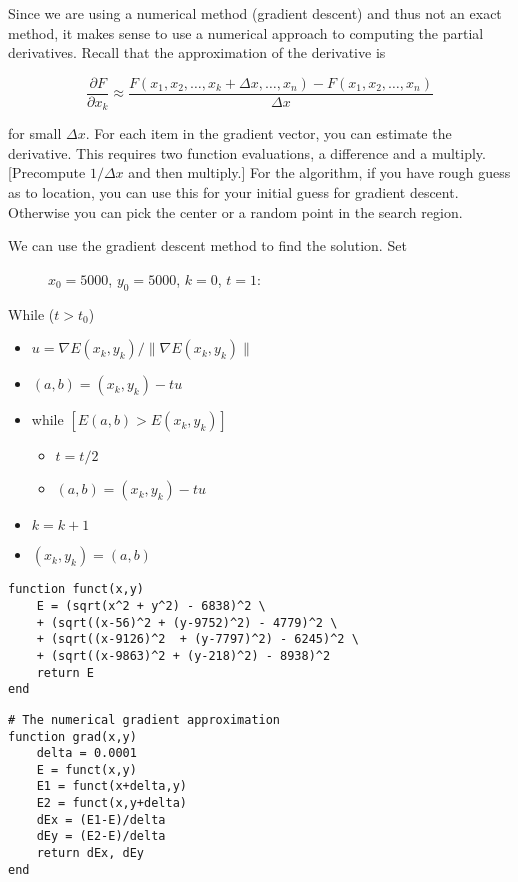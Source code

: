 Since we are using a numerical method (gradient descent) and thus not an
exact method, it makes sense to use a numerical approach to computing
the partial derivatives. Recall that the approximation of the derivative
is

\[\displaystyle \frac{\partial F}{\partial x_k} \approx \frac{F(x_1, x_2, \dots , x_k + \Delta x, \dots , x_n) - F(x_1, x_2, \dots  , x_n)}{\Delta x}\]

for small \(\Delta x\). For each item in the gradient vector, you can
estimate the derivative. This requires two function evaluations, a
difference and a multiply. {[}Precompute \(1/\Delta x\) and then
multiply.{]} For the algorithm, if you have rough guess as to location,
you can use this for your initial guess for gradient descent. Otherwise
you can pick the center or a random point in the search region.

\begin{description}
\item[We can use the gradient descent method to find the solution. Set]
\(x_0 = 5000\), \(y_0=5000\), \(k=0\), \(t=1\):
\end{description}

While (\(t > t_0\))

\begin{itemize}
\tightlist
\item
  \(u = \nabla E (x_k, y_k) /  \| \nabla E (x_k, y_k) \|\)
\item
  \((a,b) = (x_k,y_k) - t u\)
\item
  while \(\left[ E(a,b) > E(x_k,y_k)\right]\)

  \begin{itemize}
  \tightlist
  \item
    \(t = t/2\)
  \item
    \((a,b) = (x_k,y_k) - t u\)
  \end{itemize}
\item
  \(k=k+1\)
\item
  \((x_k,y_k) = (a,b)\)
\end{itemize}

\begin{verbatim}
function funct(x,y)
    E = (sqrt(x^2 + y^2) - 6838)^2 \
    + (sqrt((x-56)^2 + (y-9752)^2) - 4779)^2 \
    + (sqrt((x-9126)^2  + (y-7797)^2) - 6245)^2 \
    + (sqrt((x-9863)^2 + (y-218)^2) - 8938)^2
    return E
end
\end{verbatim}

\begin{verbatim}
# The numerical gradient approximation
function grad(x,y)
    delta = 0.0001
    E = funct(x,y)
    E1 = funct(x+delta,y)
    E2 = funct(x,y+delta)
    dEx = (E1-E)/delta
    dEy = (E2-E)/delta
    return dEx, dEy
end   
\end{verbatim}

